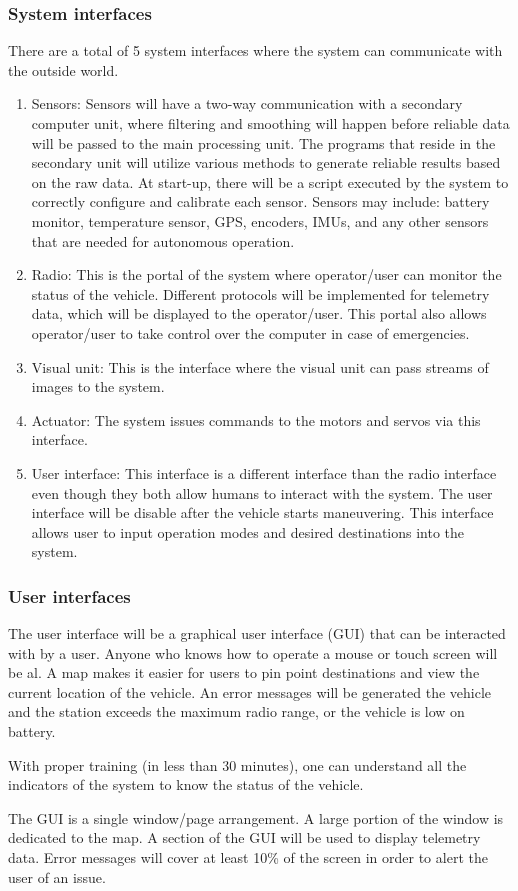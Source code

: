 \documentclass[compsoc,draftclsnofoot,onecolumn,10pt]{IEEEtran}
\begin{document}
\subsubsection{System interfaces} %
There are a total of 5 system interfaces where the system can communicate with 
the outside world.
\begin{enumerate}
	\item Sensors: Sensors will have a two-way communication with a secondary computer unit, where filtering and smoothing will happen before reliable data will be passed to the main processing unit. 
	The programs that reside in the secondary unit will utilize various methods to generate reliable results based on the raw data. 
	At start-up, there will be a script executed by the system to correctly configure and calibrate each sensor. 
	Sensors may include: battery monitor, temperature sensor, GPS, encoders, IMUs, and any other sensors that are needed for autonomous operation.
	\item Radio: This is the portal of the system where operator/user can monitor the status of the vehicle. 
	Different protocols will be implemented for telemetry data, which will be displayed to the operator/user. 
	This portal also allows operator/user to take control over the computer in case of emergencies. 
	\item Visual unit: This is the interface where the visual unit can pass streams of images to the system.
	\item Actuator: The system issues commands to the motors and servos via this interface. 
	\item User interface: This interface is a different interface than the radio interface even though they both allow humans to interact with the system. 
	The user interface will be disable after the vehicle starts maneuvering. 
	This interface allows user to input operation modes and desired destinations into the system.
\end{enumerate}

\subsubsection{User interfaces} %
The user interface will be a graphical user interface (GUI) that can be interacted with by a user. 
Anyone who knows how to operate a mouse or touch screen will be al. 
A map makes it easier for users to pin point destinations and view the current location of the vehicle. 
An error messages will be generated the vehicle and the station exceeds the maximum radio range, or the vehicle is low on battery.\par
With proper training (in less than 30 minutes), one can understand all the indicators of the system to know the status of the vehicle.\par
The GUI is a single window/page arrangement. 
A large portion of the window is dedicated to the map. 
A section of the GUI will be used to display telemetry data. 
Error messages will cover at least 10\% of the screen in order to alert the user of an issue.
\end{document}
